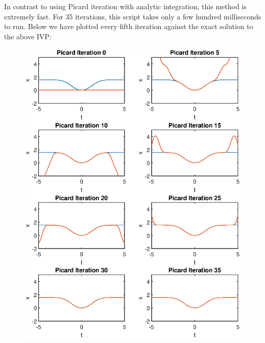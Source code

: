 \documentclass[10pt,a4paper]{article}
\theoremstyle{theorem}
\theoremstyle{definition}
\begin{document}
In contrast to using Picard iteration with analytic integration, this method is extremely fast. For 35 iterations, this script takes only a few hundred milliseconds to run. Below we have plotted every fifth iteration against the exact solution to the above IVP:
\begin{figure}[ht]
    \centering
    \includegraphics[scale=0.81]{PicardFig}
\end{figure}
\end{document}
